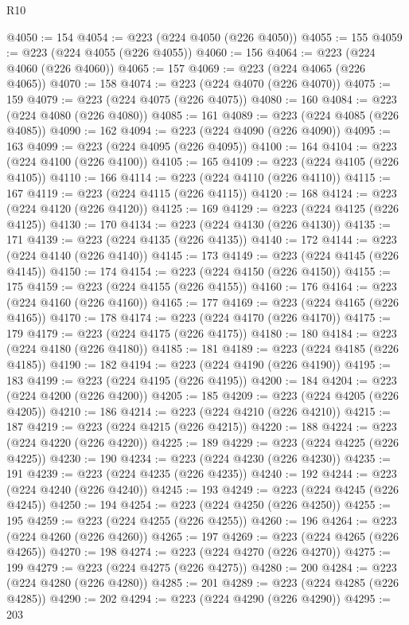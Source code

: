 \begin{lexlean}{R10}
\begin{coremodule}
@4050 := 154
@4054 := @223 (@224 @4050 (@226 @4050))
@4055 := 155
@4059 := @223 (@224 @4055 (@226 @4055))
@4060 := 156
@4064 := @223 (@224 @4060 (@226 @4060))
@4065 := 157
@4069 := @223 (@224 @4065 (@226 @4065))
@4070 := 158
@4074 := @223 (@224 @4070 (@226 @4070))
@4075 := 159
@4079 := @223 (@224 @4075 (@226 @4075))
@4080 := 160
@4084 := @223 (@224 @4080 (@226 @4080))
@4085 := 161
@4089 := @223 (@224 @4085 (@226 @4085))
@4090 := 162
@4094 := @223 (@224 @4090 (@226 @4090))
@4095 := 163
@4099 := @223 (@224 @4095 (@226 @4095))
@4100 := 164
@4104 := @223 (@224 @4100 (@226 @4100))
@4105 := 165
@4109 := @223 (@224 @4105 (@226 @4105))
@4110 := 166
@4114 := @223 (@224 @4110 (@226 @4110))
@4115 := 167
@4119 := @223 (@224 @4115 (@226 @4115))
@4120 := 168
@4124 := @223 (@224 @4120 (@226 @4120))
@4125 := 169
@4129 := @223 (@224 @4125 (@226 @4125))
@4130 := 170
@4134 := @223 (@224 @4130 (@226 @4130))
@4135 := 171
@4139 := @223 (@224 @4135 (@226 @4135))
@4140 := 172
@4144 := @223 (@224 @4140 (@226 @4140))
@4145 := 173
@4149 := @223 (@224 @4145 (@226 @4145))
@4150 := 174
@4154 := @223 (@224 @4150 (@226 @4150))
@4155 := 175
@4159 := @223 (@224 @4155 (@226 @4155))
@4160 := 176
@4164 := @223 (@224 @4160 (@226 @4160))
@4165 := 177
@4169 := @223 (@224 @4165 (@226 @4165))
@4170 := 178
@4174 := @223 (@224 @4170 (@226 @4170))
@4175 := 179
@4179 := @223 (@224 @4175 (@226 @4175))
@4180 := 180
@4184 := @223 (@224 @4180 (@226 @4180))
@4185 := 181
@4189 := @223 (@224 @4185 (@226 @4185))
@4190 := 182
@4194 := @223 (@224 @4190 (@226 @4190))
@4195 := 183
@4199 := @223 (@224 @4195 (@226 @4195))
@4200 := 184
@4204 := @223 (@224 @4200 (@226 @4200))
@4205 := 185
@4209 := @223 (@224 @4205 (@226 @4205))
@4210 := 186
@4214 := @223 (@224 @4210 (@226 @4210))
@4215 := 187
@4219 := @223 (@224 @4215 (@226 @4215))
@4220 := 188
@4224 := @223 (@224 @4220 (@226 @4220))
@4225 := 189
@4229 := @223 (@224 @4225 (@226 @4225))
@4230 := 190
@4234 := @223 (@224 @4230 (@226 @4230))
@4235 := 191
@4239 := @223 (@224 @4235 (@226 @4235))
@4240 := 192
@4244 := @223 (@224 @4240 (@226 @4240))
@4245 := 193
@4249 := @223 (@224 @4245 (@226 @4245))
@4250 := 194
@4254 := @223 (@224 @4250 (@226 @4250))
@4255 := 195
@4259 := @223 (@224 @4255 (@226 @4255))
@4260 := 196
@4264 := @223 (@224 @4260 (@226 @4260))
@4265 := 197
@4269 := @223 (@224 @4265 (@226 @4265))
@4270 := 198
@4274 := @223 (@224 @4270 (@226 @4270))
@4275 := 199
@4279 := @223 (@224 @4275 (@226 @4275))
@4280 := 200
@4284 := @223 (@224 @4280 (@226 @4280))
@4285 := 201
@4289 := @223 (@224 @4285 (@226 @4285))
@4290 := 202
@4294 := @223 (@224 @4290 (@226 @4290))
@4295 := 203

\end{coremodule}
\end{lexlean}
